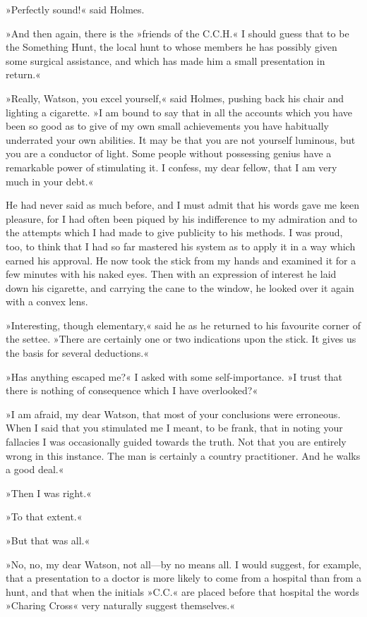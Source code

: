 »Perfectly sound!« said Holmes.

»And then again, there is the »friends of the C.C.H.« I should guess that to be the Something Hunt, the local hunt to whose members he has possibly given some surgical assistance, and which has made him a small presentation in return.«

»Really, Watson, you excel yourself,« said Holmes, pushing back his chair and lighting a cigarette. »I am bound to say that in all the accounts which you have been so good as to give of my own small achievements you have habitually underrated your own abilities. It may be that you are not yourself luminous, but you are a conductor of light. Some people without possessing genius have a remarkable power of stimulating it. I confess, my dear fellow, that I am very much in your debt.«

He had never said as much before, and I must admit that his words gave me keen pleasure, for I had often been piqued by his indifference to my admiration and to the attempts which I had made to give publicity to his methods. I was proud, too, to think that I had so far mastered his system as to apply it in a way which earned his approval. He now took the stick from my hands and examined it for a few minutes with his naked eyes. Then with an expression of interest he laid down his cigarette, and carrying the cane to the window, he looked over it again with a convex lens.

»Interesting, though elementary,« said he as he returned to his favourite corner of the settee. »There are certainly one or two indications upon the stick. It gives us the basis for several deductions.«

»Has anything escaped me?« I asked with some self-importance. »I trust that there is nothing of consequence which I have overlooked?«

»I am afraid, my dear Watson, that most of your conclusions were erroneous. When I said that you stimulated me I meant, to be frank, that in noting your fallacies I was occasionally guided towards the truth. Not that you are entirely wrong in this instance. The man is certainly a country practitioner. And he walks a good deal.«

»Then I was right.«

»To that extent.«

»But that was all.«

»No, no, my dear Watson, not all\allowbreak---\allowbreak by no means all. I would suggest, for example, that a presentation to a doctor is more likely to come from a hospital than from a hunt, and that when the initials »C.C.« are placed before that hospital the words »Charing Cross« very naturally suggest themselves.«

